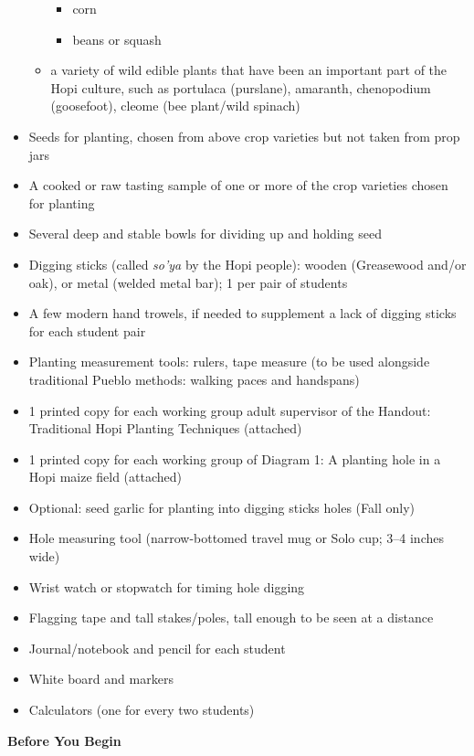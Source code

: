 \documentclass[12pt,]{article}
\providecommand{\tightlist}{%
  \setlength{\itemsep}{0pt}\setlength{\parskip}{0pt}}
\begin{document}
\begin{itemize}
\begin{itemize}
    \begin{itemize}
    \tightlist
    \item
      corn
    \item
      beans or squash
    \end{itemize}
  \item
    a variety of wild edible plants that have been an important part of the Hopi
    culture, such as portulaca (purslane), amaranth, chenopodium (goosefoot),
    cleome (bee plant/wild spinach)
  \end{itemize}
\item
  Seeds for planting, chosen from above crop varieties but not taken from prop jars
\item
  A cooked or raw tasting sample of one or more of the crop varieties chosen for planting
\item
  Several deep and stable bowls for dividing up and holding seed
\item
  Digging sticks (called \emph{so'ya} by the Hopi people): wooden (Greasewood and/or oak), or metal (welded metal bar); 1 per pair of students
\item
  A few modern hand trowels, if needed to supplement a lack of digging sticks for each student pair
\item
  Planting measurement tools: rulers, tape measure (to be used alongside traditional Pueblo methods: walking paces and handspans)
\item
  1 printed copy for each working group adult supervisor of the Handout: Traditional Hopi Planting Techniques (attached)
\item
  1 printed copy for each working group of Diagram 1: A planting hole in a Hopi maize field (attached)
\item
  Optional: seed garlic for planting into digging sticks holes (Fall only)
\item
  Hole measuring tool (narrow-bottomed travel mug or Solo cup; 3--4 inches wide)
\item
  Wrist watch or stopwatch for timing hole digging
\item
  Flagging tape and tall stakes/poles, tall enough to be seen at a distance
\item
  Journal/notebook and pencil for each student
\item
  White board and markers
\item
  Calculators (one for every two students)
\end{itemize}

\textbf{Before You Begin}
\end{document}
